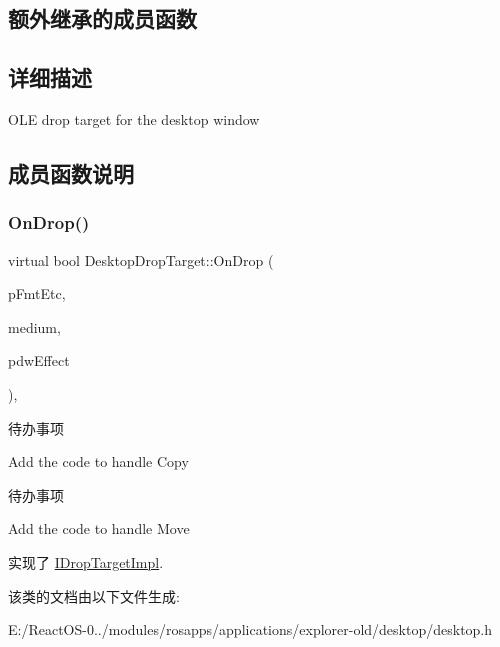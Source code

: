 \subsection*{额外继承的成员函数}


\subsection{详细描述}
O\+LE drop target for the desktop window 

\subsection{成员函数说明}
\mbox{\label{class_desktop_drop_target_a050c71c0454ff7eb0cf726f9c4d0c804}} 
\subsubsection{\texorpdfstring{On\+Drop()}{OnDrop()}}
{\footnotesize\ttfamily virtual bool Desktop\+Drop\+Target\+::\+On\+Drop (\begin{DoxyParamCaption}\item[{F\+O\+R\+M\+A\+T\+E\+TC $\ast$}]{p\+Fmt\+Etc,  }\item[{S\+T\+G\+M\+E\+D\+I\+UM \&}]{medium,  }\item[{D\+W\+O\+RD $\ast$}]{pdw\+Effect }\end{DoxyParamCaption})\hspace{0.3cm}{\ttfamily [inline]}, {\ttfamily [virtual]}}

\begin{DoxyRefDesc}{待办事项}
\item[\hyperlink{todo__todo000015}{待办事项}]Add the code to handle Copy \end{DoxyRefDesc}


\begin{DoxyRefDesc}{待办事项}
\item[\hyperlink{todo__todo000016}{待办事项}]Add the code to handle Move \end{DoxyRefDesc}


实现了 \hyperlink{class_i_drop_target_impl}{I\+Drop\+Target\+Impl}.



该类的文档由以下文件生成\+:\begin{DoxyCompactItemize}
\item 
E\+:/\+React\+O\+S-\/0../modules/rosapps/applications/explorer-\/old/desktop/desktop.\+h\end{DoxyCompactItemize}
